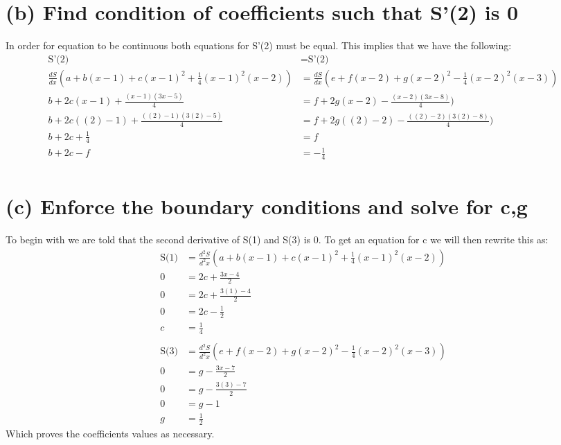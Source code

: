 \documentclass[12pt]{article}
\begin{document}
\begin{adjustwidth}{0em}{0pt}
\section*{(b) Find condition of coefficients such that S'(2) is 0}
In order for equation to be continuous both equations for S'(2) must be equal. This implies that we have the following:
\begin{align*}
   \text{S'(2)} &= \text{S'(2)} \\
             \frac{dS}{dx} (a + b(x-1) + c(x-1)^2 + \frac{1}{4}(x-1)^2(x-2)) &= \frac{dS}{dx} (e + f(x-2) + g(x-2)^2 - \frac{1}{4}(x-2)^2(x-3)) \\
             b + 2c(x-1) + \frac{(x-1)(3x-5)}{4} &= f + 2g(x-2) - \frac{(x-2)(3x-8)}{4}) \\
             b + 2c((2)-1) + \frac{((2)-1)(3(2)-5)}{4} &= f + 2g((2)-2) - \frac{((2)-2)(3(2)-8)}{4}) \\
             b + 2c + \frac{1}{4} &= f \\
             b + 2c - f &= -\frac{1}{4} \\
\end{align*}
\section*{(c) Enforce the boundary conditions and solve for c,g}
To begin with we are told that the second derivative of S(1) and S(3) is 0. To get an equation for c we will then rewrite this as:
\begin{align*}
   \text{S(1)} &= \frac{d^2S}{d^2x} (a + b(x-1) + c(x-1)^2 + \frac{1}{4}(x-1)^2(x-2)) \\
             0 &= 2c + \frac{3x - 4}{2} \\
             0 &= 2c + \frac{3(1) - 4}{2} \\
             0 &= 2c - \frac{1}{2} \\
             c &= \frac{1}{4} \\\\
    \text{S(3)} &= \frac{d^2S}{d^2x} (e + f(x-2) + g(x-2)^2 - \frac{1}{4}(x-2)^2(x-3)) \\
             0 &= g - \frac{3x - 7}{2} \\
             0 &= g - \frac{3(3) - 7}{2} \\
             0 &= g - 1 \\
             g &= \frac{1}{2}
\end{align*}
Which proves the coefficients values as necessary. 




\end{adjustwidth}
\end{document}
